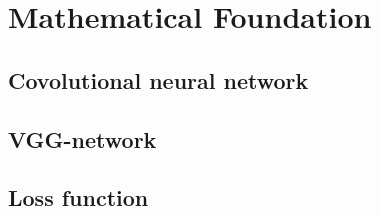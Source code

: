 
\chapter{Mathematical Foundation}
\label{chap:foundation}


\section{Covolutional neural network}





\section{VGG-network}





\section{Loss function}
